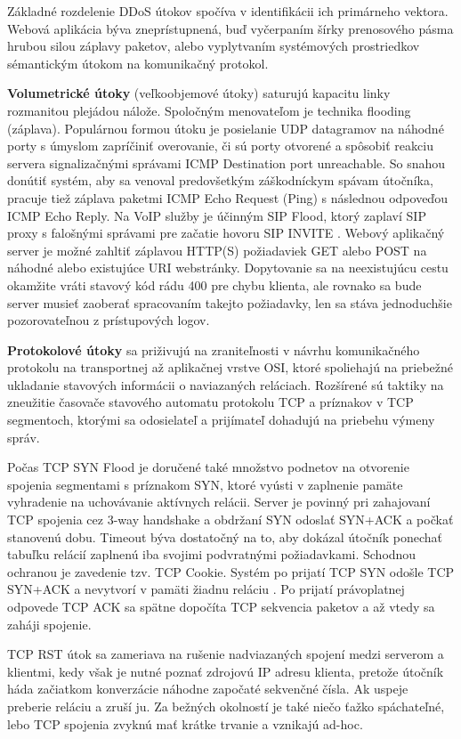 \documentclass[12pt, a4paper]{article}
\begin{document}
Základné rozdelenie DDoS útokov spočíva v identifikácii ich primárneho vektora. Webová aplikácia
býva zneprístupnená, buď vyčerpaním šírky prenosového pásma hrubou silou záplavy paketov, alebo
vyplytvaním systémových prostriedkov sémantickým útokom na komunikačný protokol.

\textbf{Volumetrické útoky} (veľkoobjemové útoky) saturujú kapacitu linky rozmanitou plejádou nálože. 
Spoločným menovateľom je technika flooding (záplava). Populárnou formou útoku je posielanie UDP datagramov 
na náhodné porty s úmyslom zapríčiniť overovanie, či sú porty otvorené a spôsobiť reakciu 
servera signalizačnými správami ICMP Destination port unreachable. So snahou donútiť systém, aby sa venoval 
predovšetkým záškodníckym spávam útočníka, pracuje tiež záplava paketmi ICMP Echo Request (Ping) 
s následnou odpoveďou ICMP Echo Reply. Na VoIP služby je účinným SIP Flood, ktorý zaplaví SIP proxy s
falošnými správami pre začatie hovoru SIP INVITE \cite{botnets}. Webový aplikačný server je možné zahltiť 
záplavou HTTP(S) požiadaviek GET alebo POST na náhodné alebo existujúce URI webstránky. Dopytovanie sa na 
neexistujúcu cestu okamžite vráti stavový kód rádu 400 pre  chybu klienta, ale rovnako sa bude server 
musieť zaoberať spracovaním takejto požiadavky, len sa stáva jednoduchšie pozorovateľnou z prístupových 
logov. 

\textbf{Protokolové útoky} sa priživujú na zraniteľnosti v návrhu komunikačného protokolu na transportnej
až aplikačnej vrstve OSI, ktoré spoliehajú na priebežné ukladanie stavových informácii o naviazaných
reláciach. Rozšírené sú taktiky na zneužitie časovače stavového automatu protokolu TCP a príznakov v TCP 
segmentoch, ktorými sa odosielateľ a prijímateľ dohadujú na priebehu výmeny správ. 

Počas TCP SYN Flood je doručené také množstvo podnetov na otvorenie spojenia segmentami s príznakom SYN, 
ktoré vyústi v zaplnenie pamäte vyhradenie na uchovávanie aktívnych relácii. Server je povinný pri 
zahajovaní TCP spojenia cez 3-way handshake a obdržaní SYN odoslať SYN+ACK a počkať stanovenú dobu. Timeout 
býva dostatočný na to, aby dokázal útočník ponechať tabuľku relácií zaplnenú iba svojimi podvratnými 
požiadavkami. Schodnou ochranou je zavedenie tzv. TCP Cookie. Systém po prijatí TCP SYN odošle TCP SYN+ACK a 
nevytvorí v pamäti žiadnu reláciu \cite{csirt-ddos}. Po prijatí právoplatnej odpovede TCP ACK sa spätne dopočíta TCP sekvencia paketov a až vtedy sa zaháji spojenie. 

TCP RST útok sa zameriava na rušenie nadviazaných spojení medzi serverom a klientmi, kedy však je
nutné poznať zdrojovú IP adresu klienta, pretože útočník háda začiatkom konverzácie náhodne započaté 
sekvenčné čísla. Ak uspeje preberie reláciu a zruší ju. Za bežných okolností je také niečo ťažko 
spáchateľné, lebo TCP spojenia zvyknú mať krátke trvanie a vznikajú ad-hoc.
\end{document}

